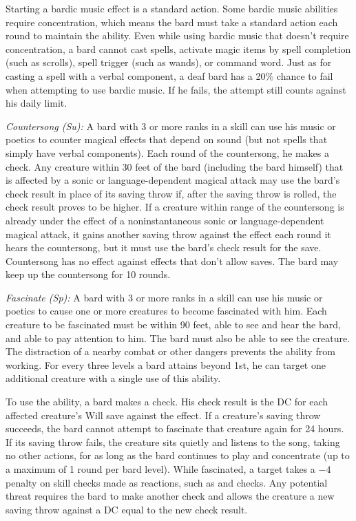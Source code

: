 Starting a bardic music effect is a standard action. Some bardic music abilities require concentration, which means the bard must take a standard action each round to maintain the ability. Even while using bardic music that doesn't require concentration, a bard cannot cast spells, activate magic items by spell completion (such as scrolls), spell trigger (such as wands), or command word. Just as for casting a spell with a verbal component, a deaf bard has a 20\% chance to fail when attempting to use bardic music. If he fails, the attempt still counts against his daily limit.

\textit{Countersong (Su):} A bard with 3 or more ranks in a  skill can use his music or poetics to counter magical effects that depend on sound (but not spells that simply have verbal components). Each round of the countersong, he makes a  check. Any creature within 30 feet of the bard (including the bard himself) that is affected by a sonic or language-dependent magical attack may use the bard's  check result in place of its saving throw if, after the saving throw is rolled, the  check result proves to be higher. If a creature within range of the countersong is already under the effect of a noninstantaneous sonic or language-dependent magical attack, it gains another saving throw against the effect each round it hears the countersong, but it must use the bard's  check result for the save. Countersong has no effect against effects that don't allow saves. The bard may keep up the countersong for 10 rounds.

\textit{Fascinate (Sp):} A bard with 3 or more ranks in a  skill can use his music or poetics to cause one or more creatures to become fascinated with him. Each creature to be fascinated must be within 90 feet, able to see and hear the bard, and able to pay attention to him. The bard must also be able to see the creature. The distraction of a nearby combat or other dangers prevents the ability from working. For every three levels a bard attains beyond 1st, he can target one additional creature with a single use of this ability.

To use the ability, a bard makes a  check. His check result is the DC for each affected creature's Will save against the effect. If a creature's saving throw succeeds, the bard cannot attempt to fascinate that creature again for 24 hours. If its saving throw fails, the creature sits quietly and listens to the song, taking no other actions, for as long as the bard continues to play and concentrate (up to a maximum of 1 round per bard level). While fascinated, a target takes a $-4$ penalty on skill checks made as reactions, such as  and  checks. Any potential threat requires the bard to make another  check and allows the creature a new saving throw against a DC equal to the new  check result.


